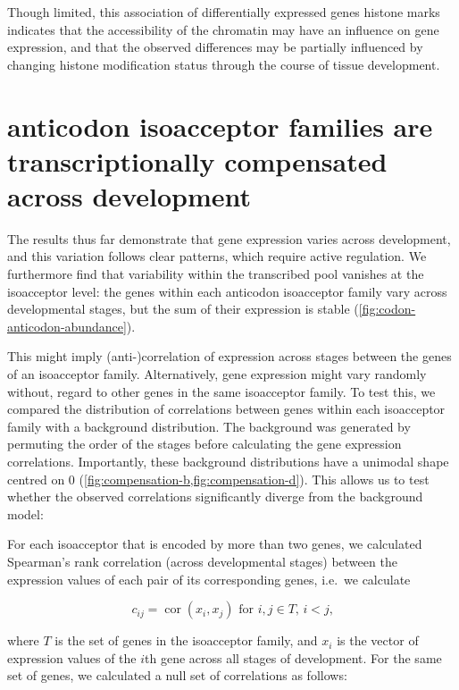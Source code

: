Though limited, this association of differentially expressed \trna genes histone
marks indicates that the accessibility of the chromatin may have an influence on
\trna gene expression, and that the observed differences may be partially
influenced by changing histone modification status through the course of tissue
development.

\section{ anticodon isoacceptor families are transcriptionally
compensated across development}

The results thus far demonstrate that \trna gene expression varies across
development, and this variation follows clear patterns, which require active
regulation. We furthermore find that variability within the transcribed
\trna pool vanishes at the isoacceptor level: the \trna genes within each
anticodon isoacceptor family vary across developmental stages, but the sum of
their expression is stable (\cref{fig:codon-anticodon-abundance}).

This might imply (anti-)correlation of expression across stages between the
genes of an isoacceptor family. Alternatively, \trna gene expression might vary
randomly without, regard to other \trna genes in the same isoacceptor family. To
test this, we compared the distribution of correlations between genes within
each isoacceptor family with a background distribution. The background was
generated by permuting the order of the stages before calculating the \trna gene
expression correlations. Importantly, these background distributions have a
unimodal shape centred on \num{0}
(\cref{fig:compensation-b,fig:compensation-d}). This allows us to test whether
the observed correlations significantly diverge from the background model:

For each isoacceptor that is encoded by more than two \trna genes, we calculated
Spearman’s rank correlation (across developmental stages) between the expression
values of each pair of its corresponding \trna genes, i.e.\ we calculate

\begin{equation}
    c_{ij} = \operatorname{cor}(x_i, x_j) \text{\ for \(i, j \in T\),
        \(i < j\),}
\end{equation}

where \(T\) is the set of \trna genes in the isoacceptor family, and \(x_i\) is
the vector of expression values of the \(i\)th \trna gene across all stages of
development. For the same set of genes, we calculated a null set of correlations
as follows:

